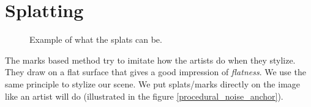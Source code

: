 \section{Splatting}

\begin{figure}
    \begin{center}
    \end{center}
    \caption{Example of what the splats can be.}
    \label{splat_examples}
\end{figure}

The marks based method try to imitate how the artists do when they stylize. They draw on a flat surface that gives a good impression of \textit{flatness}. We use the same principle to stylize our scene. We put splats/marks directly on the image like an artist will do (illustrated in the figure \ref{procedural_noise_anchor}). \newline

